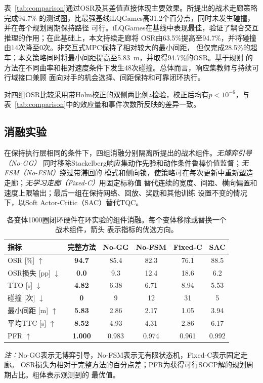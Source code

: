 \documentclass[final,5p,twocolumn]{elsarticle}
\begin{document}
表~\ref{tab:comparison}通过OSR及其差值直接体现主要效果。所提出的战术走廊策略完成94.7\%
的测试圈，比最强基线iLQGames高31.2个百分点，同时未发生碰撞，并在每个规划周期保持路径
可行。iLQGames在基线中表现最佳，验证了耦合交互推理的作用；在此基础上，本文持续走廊将
OSR由63.5\%提高至94.7\%，并将碰撞由14次降至0次。非交互式MPC保持了相对较大的最小间距，
但仅完成28.5\%的超车；本文策略同时将最小间距提高至5.83~m，并取得94.7\%的OSR。基于规则
的方法在不同曲率和相对速度条件下发生48次碰撞。总体而言，响应集教师与持续可行域接口兼顾
面向对手的机会选择、间距保持和可靠闭环执行。

对四组OSR比较采用带Holm校正的双侧两比例$z$检验，校正后均有$p<10^{-6}$，与
表~\ref{tab:comparison}中的效应量和事件次数所反映的差异一致。

\subsection{消融实验}
\label{subsec:ablation}

在保持执行层相同的条件下，四组消融分别隔离所提出的战术组件。\emph{无博弈引导（No-GG）}
同时移除Stackelberg响应集动作先验和动作条件鲁棒价值监督；\emph{无FSM（No-FSM）}绕过带滞回的
模式和侧向锁，使策略可在每次更新中重新塑造走廊；\emph{无学习走廊（Fixed-C）}用固定标称值
替代连续的宽度、间距、横向偏置和速度上限输出；最后一组在保持网络、回放、奖励和其他训练
设置不变的情况下，以Soft Actor-Critic（SAC）替代TQC。

\begin{table}[!htbp]
\centering
\footnotesize
\setlength{\tabcolsep}{2.3pt}
\renewcommand{\arraystretch}{1.08}
\caption{各变体1000圈闭环硬件在环实验的组件消融。每个变体移除或替换一个战术组件，箭头
表示指标的优选方向。}
\label{tab:ablation}
\begin{tabular}{@{}lccccc@{}}
\toprule
指标 & 完整方法 & No-GG & No-FSM & Fixed-C & SAC \\
\midrule
OSR [\%] $\uparrow$            & \textbf{94.7} & 85.4 & 82.3 & 76.1 & 88.5 \\
OSR损失 [pp] $\downarrow$    & \textbf{0.0} & 9.3 & 12.4 & 18.6 & 6.2 \\
TTO [s] $\downarrow$           & \textbf{4.82} & 6.38 & 6.71 & 8.94 & 5.53 \\
碰撞 [次] $\downarrow$    & \textbf{0} & 9 & 12 & 31 & 5 \\
最小间距 [m] $\uparrow$       & \textbf{5.83} & 2.86 & 2.17 & 1.05 & 3.94 \\
平均TTC [s] $\uparrow$       & \textbf{8.52} & 4.93 & 4.31 & 2.86 & 6.17 \\
PFR $\uparrow$                & \textbf{1.000} & 0.983 & 0.974 & 0.961 & 0.992 \\
\bottomrule
\end{tabular}
\vspace{1mm}

\begin{minipage}{\columnwidth}
\scriptsize
\emph{注：}No-GG表示无博弈引导，No-FSM表示无有限状态机，Fixed-C表示固定走廊。
OSR损失为相对于完整方法的百分点差；PFR为获得可行SOCP解的规划周期占比。粗体表示观测到的
最优值。
\end{minipage}
\end{table}
\end{document}
